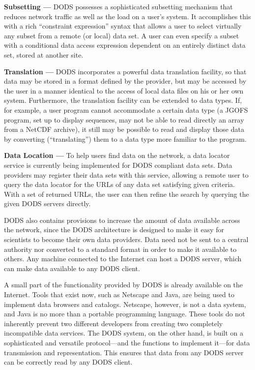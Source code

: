 \documentclass[12pt]{article}
\begin{document}
\begin{description}

\item{\bf Subsetting ---} \ac{DODS} possesses a sophisticated
subsetting mechanism that reduces network traffic as well as the load
on a user's system. It accomplishes this with a rich ``constraint
expression'' syntax that allows a user to select virtually any subset
from a remote (or local) data set. A user can even specify a subset
with a conditional data access expression dependent on an entirely
distinct data set, stored at another site.
  
\item{\bf Translation ---} \ac{DODS} incorporates a powerful data
translation facility, so that data may be stored in a format defined
by the provider, but may be accessed by the user in a manner identical
to the access of local data files on his or her own system.
Furthermore, the translation facility can be extended to data types.
If, for example, a user program cannot accommodate a certain data type
(a \ac{JGOFS} program, set up to display sequences, may not be able to 
read directly an array from a \ac{NetCDF} archive), it still may be 
possible to read and display those data by converting (``translating'') 
them to a data type more familiar to the program.

\item{\bf Data Location ---} To help users find data on the network, a
data locator service is currently being implemented for \ac{DODS}
compliant data sets. Data providers may register their data sets with
this service, allowing a remote user to query the data locator for the
\ac{URL}s of any data set satisfying given criteria. With a set of
returned \ac{URL}s, the user can then refine the search by querying
the given \ac{DODS} servers directly.

\end{description}

\ac{DODS} also contains provisions to increase the amount of data
available across the network, since the \ac{DODS} architecture is
designed to make it easy for scientists to become their own data
providers. Data need not be sent to a central authority nor converted
to a standard format in order to make it available to others. Any
machine connected to the Internet can host a \ac{DODS} server, which
can make data available to any \ac{DODS} client.

A small part of the functionality provided by \ac{DODS} is already 
available on the Internet. Tools that exist now, such as Netscape and 
Java, are being used to implement data browsers and catalogs.  
Netscape, however, is not a data system, and Java is no more than a 
portable programming language. These tools do not inherently prevent 
two different developers from creating two completely incompatible 
data services. The \ac{DODS} system, on the other hand, is built on 
a sophisticated and versatile protocol---and the functions to implement 
it---for data transmission and representation. This ensures that data 
from any \ac{DODS} server can be correctly read by any \ac{DODS} 
client. 
\end{document}
